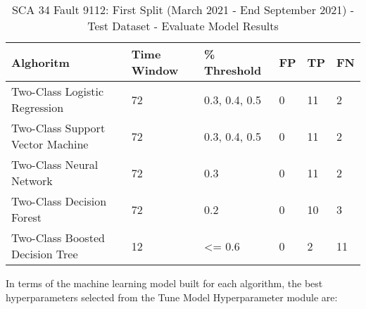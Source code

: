 \begin{table}[!ht]
    \centering
    \begin{tabular}{|l|l|l|l|l|l|}
    \hline
        Alghoritm & Time Window & \% Threshold & FP & TP & FN \\ \hline
        Two-Class Logistic Regression & 72 & 0.3, 0.4, 0.5 & 0 & 11 & 2 \\ \hline
        Two-Class Support Vector Machine & 72 & 0.3, 0.4, 0.5 & 0 & 11 & 2 \\ \hline
        Two-Class Neural Network & 72 & 0.3 & 0 & 11 & 2 \\ \hline
        Two-Class Decision Forest & 72 & 0.2 & 0 & 10 & 3 \\ \hline
        Two-Class Boosted Decision Tree & 12 & <= 0.6 & 0 & 2 & 11 \\ \hline
    \end{tabular}
    \caption{SCA 34 Fault 9112: First Split (March 2021 - End September 2021) - Test Dataset - Evaluate Model Results}
    \label{9112_SCA34_1st}
\end{table}

In terms of the machine learning model built for each algorithm, the best hyperparameters selected from the Tune Model Hyperparameter module are:

